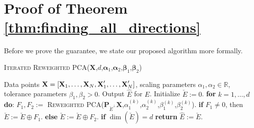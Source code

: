 \documentclass[final,12pt]{colt2018} %
\numberwithin{equation}{section}
\DeclarePairedDelimiter{\sqbracket}{[}{]}
\newcommand{\R}{\mathbb{R}}
\newcommand{\boldP}{\textbf{P}}
\newcommand{\boldX}{\textbf{X}}
\begin{document}
\section{Proof of Theorem \ref{thm:finding_all_directions}} \label{sec:finding_all_directions}

Before we prove the guarantee, we state our proposed algorithm more formally.

\begin{algorithm}[H] 
	\caption{\textsc{Iterated Reweighted PCA}($\boldX$,$d$,$\boldsymbol{\alpha}_1$,$\boldsymbol{\alpha}_2$,$\boldsymbol{\beta}_1$,$\boldsymbol{\beta}_2$)}    
	\begin{algorithmic}[1]   \label{alg:iterated_reweighted_PCA}           
		\REQUIRE Data points $\boldX = \sqbracket{\boldX_1,\ldots,\boldX_N, \boldX'_1,\ldots,\boldX'_N}$, 
		scaling parameters $\alpha_1,\alpha_2 \in \R$, 
		tolerance parameters $\beta_1,\beta_2 > 0$.
		\ENSURE Output $\hat{E}$ for $E$.
		\STATE Initialize $\check{E} := 0$.
		\STATE \textbf{for} $k =1,\ldots,d$ \textbf{do}:
		\STATE \quad $F_1,F_2 :=$ \textsc{Reweighted PCA}($\boldP_{\check{E}^\perp}\boldX$,$\alpha_1^{(k)}$,$\alpha_2^{(k)}$,$\beta_1^{(k)}$,$\beta_2^{(k)}$).
		\STATE \quad \textbf{if} $F_1 \neq 0$, then $\check{E} := \check{E}\oplus F_1$.
		\STATE \quad \textbf{else} $\check{E} := \check{E}\oplus F_2$.
		\STATE \quad \textbf{if} $\dim(\check{E}) = d$ \textbf{return} $\hat{E} := \check{E}$.
	\end{algorithmic}
\end{algorithm}
\end{document}
